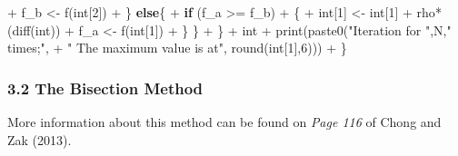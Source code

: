 \documentclass[
]{article}
\newenvironment{Shaded}{\begin{snugshade}}{\end{snugshade}}
\newcommand{\ControlFlowTok}[1]{\textcolor[rgb]{0.13,0.29,0.53}{\textbf{#1}}}
\newcommand{\DecValTok}[1]{\textcolor[rgb]{0.00,0.00,0.81}{#1}}
\newcommand{\FunctionTok}[1]{\textcolor[rgb]{0.00,0.00,0.00}{#1}}
\newcommand{\NormalTok}[1]{#1}
\newcommand{\OtherTok}[1]{\textcolor[rgb]{0.56,0.35,0.01}{#1}}
\newcommand{\SpecialCharTok}[1]{\textcolor[rgb]{0.00,0.00,0.00}{#1}}
\newcommand{\StringTok}[1]{\textcolor[rgb]{0.31,0.60,0.02}{#1}}
\begin{document}
\begin{Shaded}
\begin{Highlighting}[]
\SpecialCharTok{+}\NormalTok{       f\_b }\OtherTok{\textless{}{-}} \FunctionTok{f}\NormalTok{(int[}\DecValTok{2}\NormalTok{])}
\SpecialCharTok{+}\NormalTok{     \} }\ControlFlowTok{else}\NormalTok{\{}
\SpecialCharTok{+}       \ControlFlowTok{if}\NormalTok{ (f\_a }\SpecialCharTok{\textgreater{}=}\NormalTok{ f\_b)}
\SpecialCharTok{+}\NormalTok{       \{}
\SpecialCharTok{+}\NormalTok{         int[}\DecValTok{1}\NormalTok{] }\OtherTok{\textless{}{-}}\NormalTok{ int[}\DecValTok{1}\NormalTok{] }\SpecialCharTok{+}\NormalTok{ rho}\SpecialCharTok{*}\NormalTok{(}\FunctionTok{diff}\NormalTok{(int))}
\SpecialCharTok{+}\NormalTok{         f\_a }\OtherTok{\textless{}{-}} \FunctionTok{f}\NormalTok{(int[}\DecValTok{1}\NormalTok{])}
\SpecialCharTok{+}\NormalTok{       \} \}}
\SpecialCharTok{+}\NormalTok{   \}}
\SpecialCharTok{+}\NormalTok{   int}
\SpecialCharTok{+}   \FunctionTok{print}\NormalTok{(}\FunctionTok{paste0}\NormalTok{(}\StringTok{"Iteration for "}\NormalTok{,N,}\StringTok{" times;"}\NormalTok{,}
\SpecialCharTok{+}                \StringTok{" The maximum value is at"}\NormalTok{, }\FunctionTok{round}\NormalTok{(int[}\DecValTok{1}\NormalTok{],}\DecValTok{6}\NormalTok{)))}
\SpecialCharTok{+}\NormalTok{ \}}
\end{Highlighting}
\end{Shaded}

\hypertarget{the-bisection-method}{%
\subsubsection{3.2 The Bisection Method}\label{the-bisection-method}}

More information about this method can be found on \emph{Page 116} of
Chong and Zak (2013).
\end{document}
